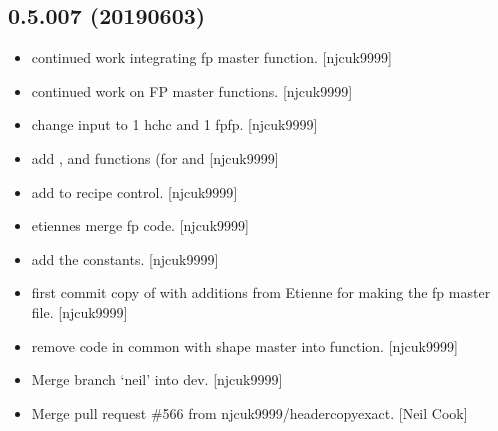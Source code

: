 \documentclass[a4paper,10pt,english]{report}
\begin{document}
\subsection{0.5.007 (2019\sphinxhyphen{}06\sphinxhyphen{}03)}
\label{\detokenize{misc/changelog:id148}}\begin{itemize}
\item {} 
 \sphinxhyphen{} continued work integrating fp master function.
{[}njcuk9999{]}

\item {} 
 \sphinxhyphen{} continued work on FP master functions. {[}njcuk9999{]}

\item {} 
 \sphinxhyphen{} change input to 1 hchc and 1 fpfp. {[}njcuk9999{]}

\item {} 
 \sphinxhyphen{} add ,  and
 functions (for  and 
{[}njcuk9999{]}

\item {} 
 \sphinxhyphen{} add  to recipe control.
{[}njcuk9999{]}

\item {} 
 \sphinxhyphen{} etiennes merge fp code. {[}njcuk9999{]}

\item {} 
 \sphinxhyphen{} add the  constants.
{[}njcuk9999{]}

\item {} 
 \sphinxhyphen{} first commit \sphinxhyphen{} copy of  \sphinxhyphen{}
with additions from Etienne for making the fp master file. {[}njcuk9999{]}

\item {} 
 \sphinxhyphen{} remove code in common with shape master
into function. {[}njcuk9999{]}

\item {} 
Merge branch ‘neil’ into dev. {[}njcuk9999{]}

\item {} 
Merge pull request \#566 from njcuk9999/header\sphinxhyphen{}copy\sphinxhyphen{}exact. {[}Neil Cook{]}


\end{itemize}
\end{document}

